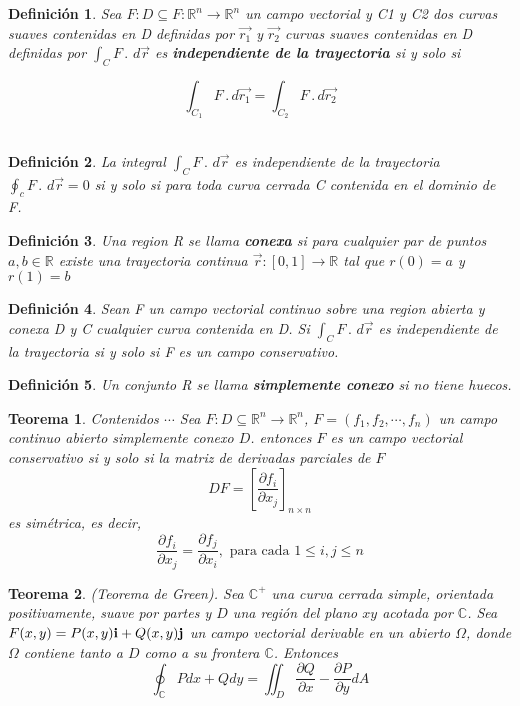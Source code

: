 \documentclass[11pt]{book}
\newcounter{Teorema}
\numberwithin{equation}{section}
\theoremstyle{plain}  %
\newtheorem{thm}{Teorema}[section]
\newtheorem{Def}{Definición}[chapter]
\begin{document}
{\begin{Def}
	Sea $F:D \subseteq F: \mathbb{R}^{n} \to \mathbb{R}^{n}$ un campo vectorial y C1 y C2 dos curvas suaves contenidas en D definidas por $\vec{r_1}$   y  $ \vec{r_2}$  curvas suaves contenidas en D definidas por  $\int_{C} F \,.\,\,d\vec{r}$ es \textbf{ independiente de la trayectoria}  si y solo si
\end{Def}
	\begin{equation*}
	\int_{C_1} F\,.\,d\vec{r_1} = \int_{C_2} F\,.\,d\vec{r_2} 
\end{equation*}
\\
\begin{Def}
	La integral 
	$\int_{C} F \,.\,\,d\vec{r}$  es independiente de la trayectoria $\oint_{c} F \,.\,\,d\vec{r} = 0$ si y solo si para toda curva cerrada C contenida en el dominio	de F.
\end{Def}
\begin{Def}
	Una region R se llama \textbf{conexa} si para cualquier par	de puntos $a,b \in \mathbb{R}$  existe una trayectoria continua $\vec{r} :[0,1] \rightarrow \mathbb{R}$ tal que  $r(0) = a$ y $r(1) = b$
\end{Def}
\begin{Def}
	Sean F un campo vectorial continuo sobre una region abierta y conexa D y C cualquier curva contenida en D. Si $\int_{C} F \,.\,\,d\vec{r}$ es independiente de la trayectoria si y solo si F es un campo conservativo. 
\end{Def}
\begin{Def}
	Un conjunto R se llama \textbf{ simplemente conexo} si no
tiene huecos.
\end{Def}
}
\newpage
\begin{thm}
Contenidos $\cdots$ Sea $F: D \subseteq \mathbb{R}^{n} \to \mathbb{R}^{n}$, $F=(f_{1},f_{2},\cdots,f_{n})$ un campo continuo abierto simplemente conexo $D$. entonces $F$ es un campo vectorial conservativo si y solo si la matriz de derivadas parciales de $F$
\begin{equation*}
    DF=[\frac{\partial f_{i}}{\partial x_{j}}]_{n\times n}
\end{equation*}
es simétrica, es decir, 
\begin{equation*}
    \frac{\partial f_{i}}{\partial x_{j}} = \frac{\partial f_{j}}{\partial x_{i}}, \text{ para cada } 1\leq i, j \leq n 
\end{equation*}
\end{thm}
\begin{thm}
(Teorema de Green). Sea $\mathbb{C}^{+}$ una curva cerrada simple, orientada positivamente, suave por partes y $D$ una región del plano $xy$ acotada por $\mathbb{C}$. Sea $F(x,y) = P(x,y)\text{\textbf{i}}+Q(x,y)\text{\textbf{j}}$ un campo vectorial derivable en un abierto $\Omega$, donde $\Omega$ contiene tanto a $D$ como a su frontera $\mathbb{C}$. Entonces
\begin{equation*}
    \oint_{\mathbb{C}} Pdx+Qdy = \iint_{D} \frac{\partial Q}{\partial x} -\frac{\partial P}{\partial y} dA
\end{equation*}
\end{thm}
\end{document}
